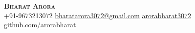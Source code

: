 \begin{center}
    \textbf{\Huge \scshape Bharat Arora} \\ \vspace{10pt}
     \small +91-9673213072 \qquad
    \href{mailto:bharatarora3072@gmail.com}{ bharatarora3072@gmail.com} \qquad
    \href{https://www.linkedin.com/in/arorabharat3072}{ arorabharat3072} \qquad
    \href{https://github.com/arorabharat}{ github.com/arorabharat}
\end{center}